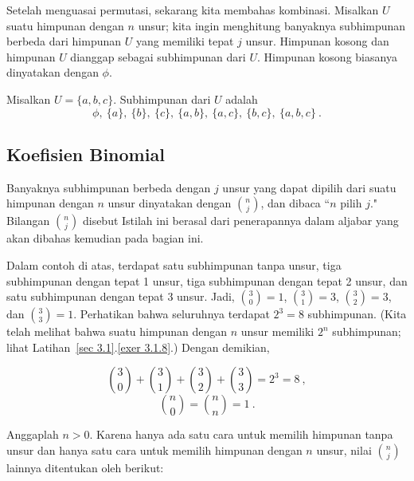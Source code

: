 Setelah menguasai permutasi, sekarang kita membahas kombinasi.  Misalkan $U$ suatu
himpunan dengan $n$ unsur; kita ingin menghitung banyaknya subhimpunan berbeda dari
himpunan $U$ yang memiliki tepat $j$ unsur.  Himpunan kosong dan himpunan $U$ dianggap
sebagai subhimpunan dari $U$.  Himpunan kosong biasanya dinyatakan dengan $\phi$.

\begin{example}\label{exam 3.7} Misalkan $U = \{a,b,c\}$.  Subhimpunan dari $U$ adalah
$$ \phi,\ \{a\},\ \{b\},\ \{c\},\ \{a,b\},\ \{a,c\},\ \{b,c\},\ \{a,b,c\}\ .$$ 
\end{example}

\subsection*{Koefisien Binomial}

Banyaknya subhimpunan berbeda dengan $j$ unsur yang dapat dipilih dari suatu himpunan
dengan $n$ unsur dinyatakan dengan ${n \choose j}$, dan dibaca ``$n$ pilih $j$."
Bilangan $n \choose j$ disebut 
Istilah ini berasal dari penerapannya dalam aljabar yang akan dibahas kemudian pada
bagian ini.

Dalam contoh di atas, terdapat satu subhimpunan tanpa unsur, tiga subhimpunan dengan
tepat 1 unsur, tiga subhimpunan dengan tepat 2 unsur, dan satu subhimpunan dengan tepat
3 unsur.  Jadi, ${3 \choose 0} = 1$, ${3 \choose 1} = 3$, ${3 \choose 2} = 3$,
dan ${3 \choose 3} = 1$.   Perhatikan bahwa seluruhnya terdapat $2^3 = 8$ subhimpunan.
(Kita telah melihat bahwa suatu himpunan dengan $n$ unsur memiliki $2^n$ subhimpunan;
lihat Latihan~\ref{sec 3.1}.\ref{exer
3.1.8}.) Dengan demikian,

$$ {3 \choose 0} + {3 \choose 1}  + {3 \choose 2} + {3 \choose 3} = 2^3 = 8\ ,
$$
$$ {n \choose 0}  = {n \choose n} = 1\ .  
$$

Anggaplah $n > 0$.  Karena hanya ada satu cara untuk memilih himpunan tanpa unsur dan
hanya satu cara untuk memilih himpunan dengan $n$ unsur, nilai $n \choose j$ lainnya
ditentukan oleh  berikut:

